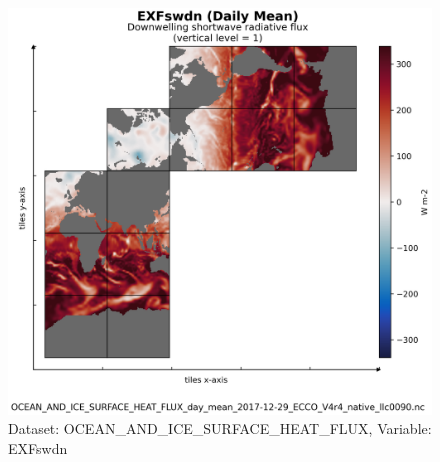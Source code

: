 \begin{figure}[H]
\centering
\includegraphics[scale=0.55]{../images/plots/v4r4/native_plots/Ocean_and_Sea-Ice_Surface_Heat_Fluxes/EXFswdn.png}
\caption{Dataset: OCEAN\_AND\_ICE\_SURFACE\_HEAT\_FLUX, Variable: EXFswdn}
\label{tab:table-OCEAN_AND_ICE_SURFACE_HEAT_FLUX_EXFswdn-Plot}
\end{figure}
\newpage
\pagebreak
